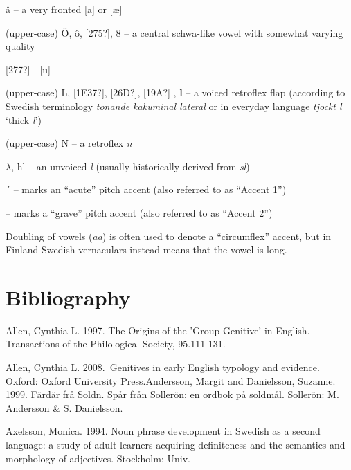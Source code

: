 â – a very fronted [a] or [æ]

(upper-case) Ö, ô, [275?], \textsc{8  – }a central schwa-like vowel with somewhat varying quality

[277?] - [u]

(upper-case) L, [1E37?], [26D?], [19A?] , \textbf{l }– a voiced retroflex flap (according to Swedish terminology \textit{tonande kakuminal lateral} or in everyday language \textit{tjockt l} ‘thick \textit{l}’)

(upper-case) N – a retroflex \textit{n}

$\lambda $, hl – an unvoiced \textit{l } (usually historically derived from \textit{sl})

´  – marks an “acute” pitch accent (also referred to as “Accent 1”)

{\textasciigrave} – marks a “grave” pitch accent (also referred to as “Accent 2”)

Doubling of vowels (\textit{aa}) is often used to denote a “circumflex” accent, but in Finland Swedish vernaculars instead means that the vowel is long.

\chapter[Bibliography]{\rmfamily\bfseries Bibliography}

\begin{styleBodytextC}
Allen, Cynthia L. 1997. The Origins of the 'Group Genitive' in English. Transactions of the Philological Society, 95.111-131.

\end{styleBodytextC}

\begin{styleBodytextC}
Allen, Cynthia L. 2008.~Genitives in early English typology and evidence. Oxford: Oxford University Press.Andersson, Margit and Danielsson, Suzanne. 1999. Färdär frå Soldn. Spår från Sollerön: en ordbok på soldmål. Sollerön: M. Andersson \& S. Danielsson.

\end{styleBodytextC}

\begin{styleBodytextC}
Axelsson, Monica. 1994. Noun phrase development in Swedish as a second language: a study of adult learners acquiring definiteness and the semantics and morphology of adjectives. Stockholm: Univ.

\end{styleBodytextC}


